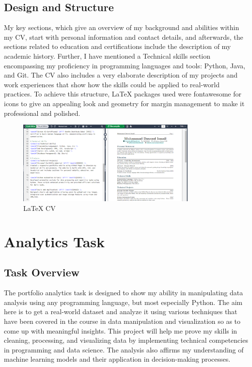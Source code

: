 \documentclass[a4paper,12pt]{article}
\begin{document}
\subsection{Design and Structure}
My key sections, which give an overview of my background and abilities within my CV, start with personal information and contact details, and afterwards, the sections related to education and certifications include the description of my academic history. Further, I have mentioned a Technical skills section encompassing my proficiency in programming languages and tools: Python, Java, and Git. The CV also includes a very elaborate description of my projects and work experiences that show how the skills could be applied to real-world practices. To achieve this structure, LaTeX packages used were fontawesome for icons to give an appealing look and geometry for margin management to make it professional and polished.

\begin{figure}[h!]
    \centering
    \includegraphics[width=0.8\textwidth]{cv.png} %
    \caption{LaTeX CV}
\end{figure}

\section{Analytics Task}

\subsection{Task Overview}
The portfolio analytics task is designed to show my ability in manipulating data analysis using any programming language, but most especially Python. The aim here is to get a real-world dataset and analyze it using various techniques that have been covered in the course in data manipulation and visualization so as to come up with meaningful insights. This project will help me prove my skills in cleaning, processing, and visualizing data by implementing technical competencies in programming and data science. The analysis also affirms my understanding of machine learning models and their application in decision-making processes.
\end{document}
